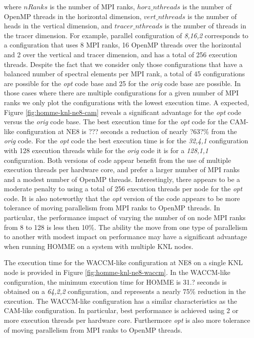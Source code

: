 where $nRanks$ is the number of MPI ranks, $horz\_nthreads$ is the number of OpenMP threads in the horizontal dimension, $vert\_nthreads$ is the number of heads in the vertical dimension, and $tracer\_nthreads$ is the number of threads in the tracer dimension.  For example,  parallel configuration of {\em 8,16,2} corresponds to a configuration that uses 8 MPI ranks, 16 OpenMP threads over the horizontal and 2 over the vertical and tracer dimension, and has a total of 256 execution threads.   Despite the fact that we consider only those configurations that have a balanced number of spectral elements per MPI rank,  a total of 45 configurations are possible for the {\em opt} code base and 25 for the {\em orig} code base are possible.  In those cases where there are multiple configurations for a given number of MPI ranks we only plot the configurations with the lowest execution time.  A expected, Figure \ref{fig:homme-knl-ne8-cam} reveals a significant advantage for the {\em opt} code versus the {\em orig} code base.  The best execution time for the {\em opt} code for the CAM-like configuration at NE8 is {\color{red} ???} seconds a reduction of nearly {\color{red} ?63?\%} from the {\em orig} code.  For the {\em opt} code the best execution time is for the {\em 32,4,1} configuration with 128 execution threads while for the {\em orig} code it is for a {\em 128,1,1} configuration.  Both versions of code appear benefit from the use of multiple execution threads per hardware core, and prefer a larger number of MPI ranks and a modest number of OpenMP threads.  Interestingly, there appears to be a moderate penalty to using a total of 256 execution threads per node for the {\em opt} code.  It is also noteworthy that the {\em opt} version of the code appears to be more tolerance of moving parallelism from MPI ranks to OpenMP threads.  In particular, the performance impact of varying the number of on node MPI ranks from 8 to 128 is less then 10\%.  The ability the move from one type of parallelism to another with modest impact on performance may have a significant advantage when running HOMME on a system with multiple KNL nodes.  

The execution time for the WACCM-like configuration at NE8 on a single KNL node is provided in Figure \ref{fig:homme-knl-ne8-waccm}.  In the WACCM-like configuration, the minimum execution time for HOMME is {\color{red} 31.?} seconds is obtained on a {\em 64,2,2} configuration, and represents a nearly 75\% reduction in the execution. The WACCM-like configuration has a similar characteristics as the CAM-like configuration. In particular, best performance is achieved using 2 or more execution threads per hardware core.  Furthermore {\em opt} is also more tolerance of moving parallelism from MPI ranks to OpenMP threads.  

